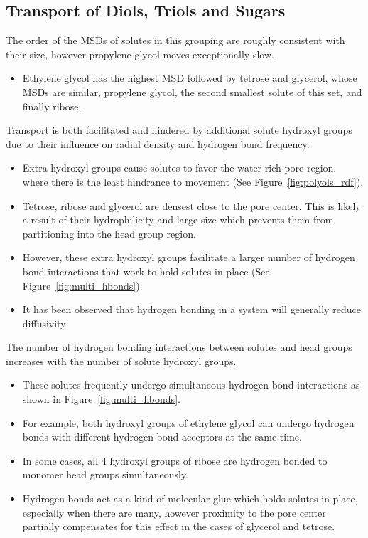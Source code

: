 \documentclass{article}
\begin{document}
  \subsection*{Transport of Diols, Triols and Sugars}  %
  
  The order of the MSDs of solutes in this grouping are roughly consistent with 
  their size, however propylene glycol moves exceptionally slow.  %
  \begin{itemize}
  	\item Ethylene glycol has the highest MSD followed by tetrose
  	and glycerol, whose MSDs are similar, propylene glycol, the second smallest
  	solute of this set, and finally ribose.
  \end{itemize}
  
  Transport is both facilitated and hindered by additional solute hydroxyl groups
  due to their influence on radial density and hydrogen bond frequency.  	
  \begin{itemize} 
    \item Extra hydroxyl groups cause solutes to favor the water-rich pore region.
    where there is the least hindrance to movement (See Figure~\ref{fig:polyols_rdf}).
    \item Tetrose, ribose and glycerol are densest close to the pore center. This is 
    likely a result of their hydrophilicity and large size which prevents them from
    partitioning into the head group region.
    \item However, these extra hydroxyl groups facilitate a larger number of 
    hydrogen bond interactions that work to hold solutes in place (See Figure~\ref{fig:multi_hbonds}).
    \item It has been observed that hydrogen bonding in a system will generally
    reduce diffusivity~\cite{srinivas_computer_1999}
  \end{itemize}
  
  The number of hydrogen bonding interactions between solutes and head groups
  increases with the number of solute hydroxyl groups.
  \begin{itemize}
    \item These solutes frequently undergo simultaneous hydrogen bond interactions as
    shown in Figure~\ref{fig:multi_hbonds}. 
    \item For example, both hydroxyl groups of ethylene glycol can undergo hydrogen
    bonds with different hydrogen bond acceptors at the same time.
    \item In some cases, all 4 hydroxyl groups of ribose are hydrogen bonded to monomer
    head groups simultaneously.
    \item Hydrogen bonds act as a kind of molecular glue which holds solutes in place, 
    especially when there are many, however proximity to the pore center partially 
    compensates for this effect in the cases of glycerol and tetrose.
  \end{itemize}
  
\end{document}
